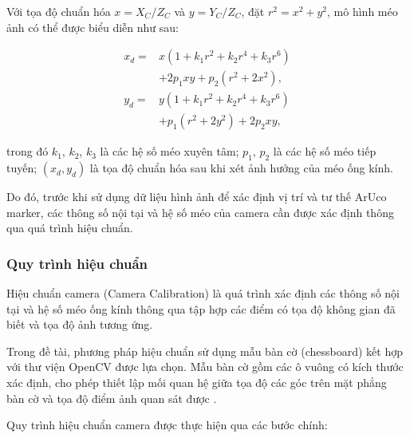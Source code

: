Với tọa độ chuẩn hóa $x=X_C/Z_C$ và $y=Y_C/Z_C$, đặt $r^2=x^2+y^2$, mô hình méo ảnh có thể được biểu diễn như sau:

\begin{equation}
\begin{aligned}
x_d ={}&
x(1+k_1r^2+k_2r^4+k_3r^6)\\
&+2p_1xy+p_2(r^2+2x^2),\\[4pt]
y_d ={}&
y(1+k_1r^2+k_2r^4+k_3r^6)\\
&+p_1(r^2+2y^2)+2p_2xy,
\end{aligned}
\label{eq:camera_distortion}
\end{equation}

trong đó $k_1$, $k_2$, $k_3$ là các hệ số méo xuyên tâm; $p_1$, $p_2$ là các hệ số méo tiếp tuyến; $(x_d,y_d)$ là tọa độ chuẩn hóa sau khi xét ảnh hưởng của méo ống kính.

Do đó, trước khi sử dụng dữ liệu hình ảnh để xác định vị trí và tư thế ArUco marker, các thông số nội tại và hệ số méo của camera cần được xác định thông qua quá trình hiệu chuẩn.

\subsubsection{Quy trình hiệu chuẩn}

Hiệu chuẩn camera (Camera Calibration) là quá trình xác định các thông số nội tại và hệ số méo ống kính thông qua tập hợp các điểm có tọa độ không gian đã biết và tọa độ ảnh tương ứng.

Trong đề tài, phương pháp hiệu chuẩn sử dụng mẫu bàn cờ (chessboard) kết hợp với thư viện OpenCV được lựa chọn. Mẫu bàn cờ gồm các ô vuông có kích thước xác định, cho phép thiết lập mối quan hệ giữa tọa độ các góc trên mặt phẳng bàn cờ và tọa độ điểm ảnh quan sát được \cite{zhang2000calibration}.

Quy trình hiệu chuẩn camera được thực hiện qua các bước chính:

